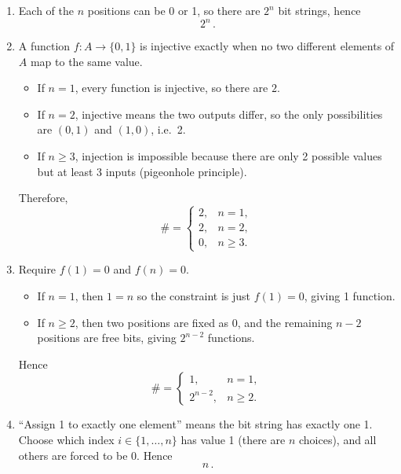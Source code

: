 \documentclass[12pt]{article}
\begin{document}
\begin{enumerate}[label=(\alph*)]
\item Each of the $n$ positions can be 0 or 1, so there are $2^n$ bit strings, hence
\[
\boxed{\,2^n\,}.
\]

\item A function $f:A\to\{0,1\}$ is injective exactly when no two different elements of $A$ map to the same value.
\begin{itemize}[leftmargin=*]
\item If $n=1$, every function is injective, so there are $2$.
\item If $n=2$, injective means the two outputs differ, so the only possibilities are $(0,1)$ and $(1,0)$, i.e.\ 2.
\item If $n\ge 3$, injection is impossible because there are only 2 possible values but at least 3 inputs (pigeonhole principle).
\end{itemize}
Therefore,
\[
\boxed{\,
\#=
\begin{cases}
2, & n=1,\\
2, & n=2,\\
0, & n\ge 3.
\end{cases}
\,}
\]

\item Require $f(1)=0$ and $f(n)=0$.
\begin{itemize}[leftmargin=*]
\item If $n=1$, then $1=n$ so the constraint is just $f(1)=0$, giving 1 function.
\item If $n\ge 2$, then two positions are fixed as 0, and the remaining $n-2$ positions are free bits, giving $2^{n-2}$ functions.
\end{itemize}
Hence
\[
\boxed{\,
\#=
\begin{cases}
1, & n=1,\\
2^{n-2}, & n\ge 2.
\end{cases}
\,}
\]

\item ``Assign 1 to exactly one element'' means the bit string has exactly one 1.
Choose which index $i\in\{1,\dots,n\}$ has value 1 (there are $n$ choices), and all others are forced to be 0. Hence
\[
\boxed{\,n\,}.
\]
\end{enumerate}
\end{document}
